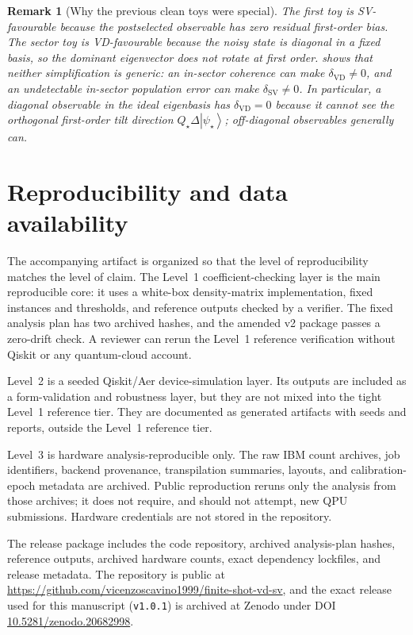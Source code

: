 \documentclass[11pt]{article}
\newtheorem{remark}{Remark}
\newcommand{\1}{\mathbf{1}}
\newcommand{\ket}[1]{\left|#1\right\rangle}
\begin{document}
\begin{remark}[Why the previous clean toys were special]
The first toy is SV-favourable because the postselected observable has zero residual first-order bias.  The sector toy is VD-favourable because the noisy state is diagonal in a fixed basis, so the dominant eigenvector does not rotate at first order.   shows that neither simplification is generic: an in-sector coherence can make \(\delta_{\mathrm{VD}}\ne0\), and an undetectable in-sector population error can make \(\delta_{\mathrm{SV}}\ne0\).  In particular, a diagonal observable in the ideal eigenbasis has \(\delta_{\mathrm{VD}}=0\) because it cannot see the orthogonal first-order tilt direction \(Q_\star\Delta\ket{\psi_\star}\); off-diagonal observables generally can.
\end{remark}

\section{Reproducibility and data availability}

The accompanying artifact is organized so that the level of reproducibility matches the level of claim.  The Level~1 coefficient-checking layer is the main reproducible core: it uses a white-box density-matrix implementation, fixed instances and thresholds, and reference outputs checked by a verifier.  The fixed analysis plan has two archived hashes, and the amended v2 package passes a zero-drift check.  A reviewer can rerun the Level~1 reference verification without Qiskit or any quantum-cloud account.

Level~2 is a seeded Qiskit/Aer device-simulation layer.  Its outputs are included as a form-validation and robustness layer, but they are not mixed into the tight Level~1 reference tier.  They are documented as generated artifacts with seeds and reports, outside the Level~1 reference tier.

Level~3 is hardware analysis-reproducible only.  The raw IBM count archives, job identifiers, backend provenance, transpilation summaries, layouts, and calibration-epoch metadata are archived.  Public reproduction reruns only the analysis from those archives; it does not require, and should not attempt, new QPU submissions.  Hardware credentials are not stored in the repository.

The release package includes the code repository, archived analysis-plan hashes, reference outputs, archived hardware counts, exact dependency lockfiles, and release metadata.  The repository is public at \url{https://github.com/vicenzoscavino1999/finite-shot-vd-sv}, and the exact release used for this manuscript (\texttt{v1.0.1}) is archived at Zenodo under DOI \href{https://doi.org/10.5281/zenodo.20682998}{10.5281/zenodo.20682998}.
\end{document}
